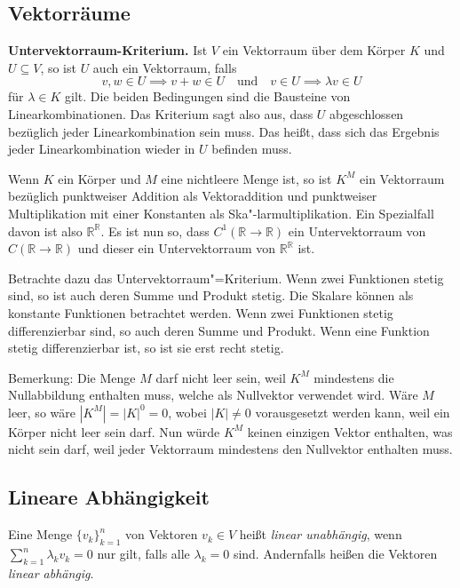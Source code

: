 \documentclass[a4paper,11pt,fleqn,twoside]{scrartcl}
\numberwithin{equation}{section}
\newcommand{\R}{\mathbb R}
\newcommand{\strong}[1]{{\sf\bfseries #1}}
\newenvironment{Definition}{\par\noindent\strong{Definition.}}{\par}
\begin{document}
\subsection{Vektorräume}
\strong{Untervektorraum-Kriterium.}
Ist $V$ ein Vektorraum über
dem Körper $K$ und $U\subseteq V$, so ist $U$ auch ein Vektorraum,
falls
\begin{equation}
v,w\in U\implies v+w\in U
\quad\text{und}\quad
v\in U\implies \lambda v\in U
\end{equation}
für $\lambda\in K$ gilt. Die beiden Bedingungen sind die Bausteine von
Linearkombinationen. Das Kriterium sagt also aus, dass $U$
abgeschlossen bezüglich jeder Linearkombination sein muss.
Das heißt, dass sich das Ergebnis jeder Linearkombination wieder
in $U$ befinden muss.

Wenn $K$ ein Körper und
$M$ eine nichtleere Menge ist, so ist $K^M$ ein Vektorraum bezüglich
punktweiser Addition als Vektoraddition und punktweiser Multiplikation
mit einer Konstanten als Ska"-larmultiplikation. Ein Spezialfall davon
ist also $\R^\R$. Es ist nun so, dass $C^1(\R\to\R)$ ein Untervektorraum
von $C(\R\to\R)$ und dieser ein Untervektorraum von $\R^\R$ ist.

Betrachte dazu das Untervektorraum"=Kriterium. Wenn zwei Funktionen
stetig sind, so ist auch deren Summe und Produkt stetig. Die Skalare
können als konstante Funktionen betrachtet werden. Wenn zwei
Funktionen stetig differenzierbar sind, so auch deren Summe und
Produkt. Wenn eine Funktion stetig differenzierbar ist, so ist sie
erst recht stetig.

Bemerkung: Die Menge $M$ darf nicht leer sein, weil $K^M$ mindestens
die Nullabbildung enthalten muss, welche als Nullvektor verwendet
wird. Wäre $M$ leer, so wäre $|K^M|=|K|^0=0$, wobei $|K|\ne 0$
vorausgesetzt werden kann, weil ein Körper nicht leer sein darf.
Nun würde $K^M$ keinen einzigen Vektor enthalten, was nicht sein darf,
weil jeder Vektorraum mindestens den Nullvektor enthalten muss.

\subsection{Lineare Abhängigkeit}
\begin{Definition}
Eine Menge $\{v_k\}_{k=1}^n$ von Vektoren $v_k\in V$ heißt
\emph{linear unabhängig}, wenn $\sum_{k=1}^n \lambda_k v_k=0$ nur
gilt, falls alle $\lambda_k=0$ sind. Andernfalls heißen die Vektoren
\emph{linear abhängig}.
\end{Definition}
\end{document}
